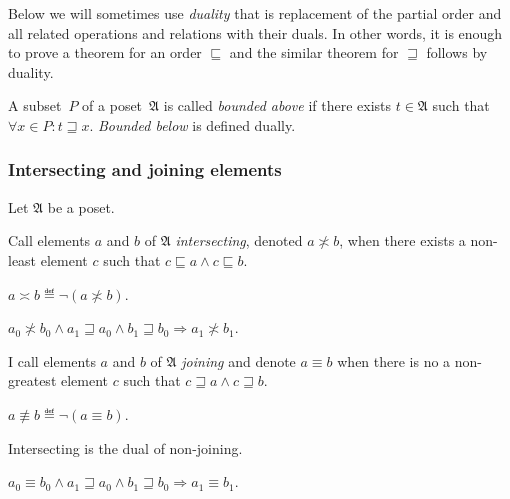 Below we will sometimes use \emph{duality}
that is replacement of the partial order and all related operations
and relations with their duals. In other words, it is enough to prove
a theorem for an order $\sqsubseteq$ and the similar theorem for
$\sqsupseteq$ follows by duality.

\begin{defn}
A subset~$P$ of a poset~$\mathfrak{A}$ is called \emph{bounded
above} if there exists $t\in\mathfrak{A}$ such that
$\forall x\in P:t\sqsupseteq x$. \emph{Bounded below} is
defined dually.
\end{defn}

\subsubsection{Intersecting and joining elements}\label{sec-common-intersection}

Let $\mathfrak{A}$ be a poset.
\begin{defn}
Call elements $a$ and $b$ of $\mathfrak{A}$
\emph{intersecting}, denoted $a\nasymp b$, when there exists a non-least
element $c$ such that $c\sqsubseteq a\land c\sqsubseteq b$.
\end{defn}

\begin{defn}
$a\asymp b\eqdef\lnot(a\nasymp b)$.\end{defn}
\begin{obvious}
$a_{0}\nasymp b_{0}\land a_{1}\sqsupseteq a_{0}\land b_{1}\sqsupseteq b_{0}\Rightarrow a_{1}\nasymp b_{1}$.\end{obvious}
\begin{defn}
I call elements $a$ and $b$ of $\mathfrak{A}$
\emph{joining} and denote $a\equiv b$ when there is no a non-greatest
element $c$ such that $c\sqsupseteq a\land c\sqsupseteq b$.
\end{defn}

\begin{defn}
$a\nequiv b\eqdef\lnot(a\equiv b)$.\end{defn}
\begin{obvious}
Intersecting is the dual of non-joining.
\end{obvious}

\begin{obvious}
$a_{0}\equiv b_{0}\land a_{1}\sqsupseteq a_{0}\land b_{1}\sqsupseteq b_{0}\Rightarrow a_{1}\equiv b_{1}$.
\end{obvious}

